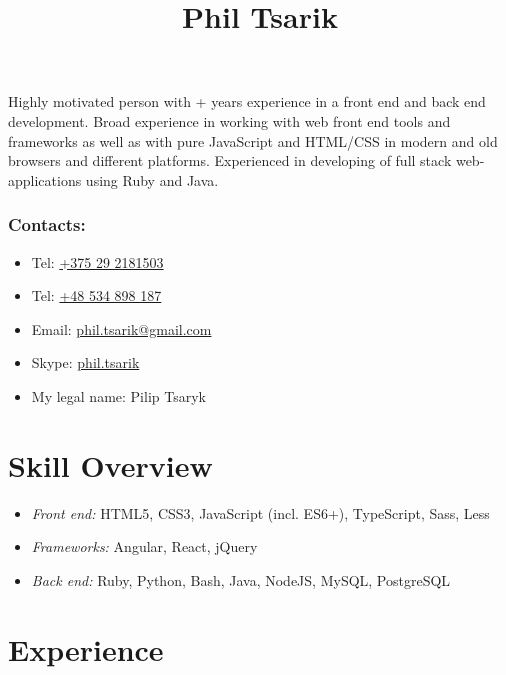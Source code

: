 \documentclass[a4paper, 12pt]{article}
\title{Phil Tsarik}
\author{}
\date{}
\newcommand{\itemlabel}[1]{
    \textit{#1:}}
\newcommand{\defvalue}[2]{\ifx#1\empty#2\else#1\fi}
\newcommand{\yearsexp}{%
    \FPeval{\result}{clip(\the\year - 2011)}%
    \defvalue{\result}{5+}}
\begin{document}
\maketitle

Highly motivated person with \yearsexp{} years experience in a front end and back end development.
Broad experience in working with web front end tools and frameworks as well as with pure JavaScript and HTML/CSS in modern and old browsers and different platforms.
Experienced in developing of full stack web-applications using Ruby and Java.

\subsubsection*{Contacts:}
\begin{itemize}
    \item Tel: \href{tel:+375292181503}{+375 29 2181503}
    \item Tel: \href{tel:+48534898187}{+48 534 898 187}
    \item Email: \href{mailto:phil.tsarik@gmail.com}{phil.tsarik@gmail.com}
    \item Skype: \href{callto:phil.tsarik}{phil.tsarik}
    \item My legal name: Pilip Tsaryk
\end{itemize}


\section*{Skill Overview}

    \begin{itemize}
        \item \itemlabel{Front end} HTML5, CSS3, JavaScript (incl. ES6+), TypeScript, Sass, Less
        \item \itemlabel{Frameworks} Angular, React, jQuery
        \item \itemlabel{Back end} Ruby, Python, Bash, Java, NodeJS, MySQL, PostgreSQL
    \end{itemize}


\section*{Experience}
\end{document}

